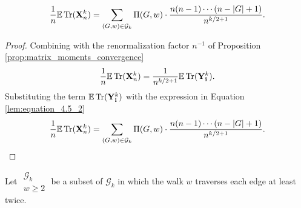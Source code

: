 \begin{lemma}
  \label{lem:equation_4.5_3}
  \[
  \frac{1}{n} \mathbb{E} \operatorname{Tr} (\mathbf{X}_n^k) = \sum_{(G,w) \in \mathcal{G}_k} \Pi (G,w) \cdot \frac{n (n-1) \cdots (n - |G| + 1)}{n^{k/2+1}}.
  \]
\end{lemma}
\begin{proof}
  Combining with the renormalization factor $n^{-1}$ of Proposition \ref{prop:matrix_moments_convergence}
  \[
  \frac{1}{n} \mathbb{E} \operatorname{Tr} (\mathbf{X}_n^k) = \frac{1}{n^{k/2+1}} \mathbb{E} \operatorname{Tr} (\mathbf{Y}_\mathbf{i}^k).
  \]
  Substituting the term $\mathbb{E} \operatorname{Tr} (\mathbf{Y}_\mathbf{i}^k)$ with the expression in Equation \ref{lem:equation_4.5_2}
  \[
  \frac{1}{n} \mathbb{E} \operatorname{Tr} (\mathbf{X}_n^k) = \sum_{\substack{(G,w) \in \mathcal{G}_k}} \Pi (G,w) \cdot \frac{n (n-1) \cdots (n - |G| + 1)}{n^{k/2+1}}.
  \]
\end{proof}
\begin{definition}
  \label{def:g_k_ge_2}
  Let $\substack{\mathcal{G}_k \\ w \geq 2}$ be a subset of $\mathcal{G}_k$ 
  in which the walk $w$ traverses each edge at least twice.
\end{definition}

